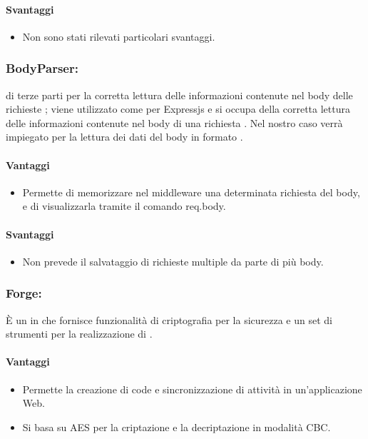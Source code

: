 	\paragraph{Svantaggi}
	\begin{itemize}
	\item Non sono stati rilevati particolari svantaggi.
	\end{itemize}

	\subsubsection{BodyParser:}  di terze parti per la corretta lettura delle informazioni contenute nel body delle richieste ; viene utilizzato come  per {Expressjs} e si occupa della corretta lettura delle informazioni contenute nel body di una richiesta
. Nel nostro caso verrà impiegato per la lettura dei dati del body in formato .
	\paragraph{Vantaggi}
	\begin{itemize}
	\item Permette di memorizzare nel middleware una determinata richiesta del body, e di visualizzarla tramite il comando req.body.
	\end{itemize}
	\paragraph{Svantaggi}
	\begin{itemize}
	\item Non prevede il salvataggio di richieste multiple da parte di più body.
	\end{itemize}


	\subsubsection{Forge:} È un  in  che fornisce funzionalità di criptografia per la sicurezza e un set di strumenti per la realizzazione di .
	\paragraph{Vantaggi}
	\begin{itemize}
	\item Permette la creazione di code e sincronizzazione di attività in un'applicazione Web.
	\item Si basa su AES per la criptazione e la decriptazione in modalità CBC.
	\end{itemize}
	
